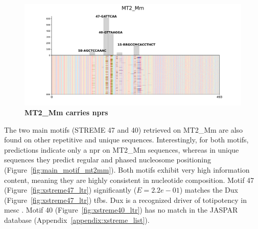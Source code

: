 \documentclass[11pt]{book}
\begin{document}
\begin{figure}[htbp]
    \centering
    \includegraphics[trim=3.2cm 0cm 2.5cm 1.5cm, clip,width=\textwidth]{Figures/Results/xstreme_onrep_seq/MT2_Mm.pdf}
    \caption{\textbf{MT2\_Mm carries \glspl{npr}}}
    \label{fig:mt2_mm}
\end{figure}

The two main motifs (STREME 47 and 40) retrieved on MT2\_Mm are also found on other repetitive and unique sequences. Interestingly, for both motifs, predictions indicate only a \gls{npr} on MT2\_Mm sequences, whereas in unique sequences they predict regular and phased nucleosome positioning (Figure~\ref{fig:main_motif_mt2mm}). Both motifs exhibit very high information content, meaning they are highly consistent in nucleotide composition. Motif 47 (Figure~\ref{fig:xstreme47_ltr}) significantly ($E=2.2e-01$) matches the Dux (Figure~\ref{fig:xstreme47_ltr}) \gls{tfbs}. Dux is a recognized driver of totipotency in \gls{mesc} \cite{ren_dux_2022}. Motif 40 (Figure~\ref{fig:xstreme40_ltr}) has no match in the JASPAR database (Appendix~\ref{appendix:xstreme_list}).
\end{document}
